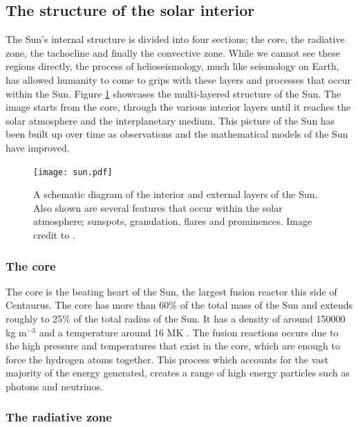 \subsection{The structure of the solar interior}

    The Sun's internal structure is divided into four sections; the core, the radiative zone, the tachocline and finally the convective zone.
    While we cannot see these regions directly, the process of helioseismology, much like seismology on Earth, has allowed humanity to come to grips with these layers and processes that occur within the Sun.
    Figure \ref{fig:Sun} showcases the multi-layered structure of the Sun.
    The image starts from the core, through the various interior layers until it reaches the solar atmosphere and the interplanetary medium.
    This picture of the Sun has been built up over time as observations and the mathematical models of the Sun have improved. 
    
    \begin{figure}
        \centering
        \texttt{[image: sun.pdf]}
        \caption{
                A schematic diagram of the interior and external layers of the Sun.
                Also shown are several features that occur within the solar atmosphere; sunspots, granulation, flares and prominences.
                Image credit to \cite{sun_image}.
               }
        \label{fig:Sun}
    \end{figure}

\subsubsection{The core}

    The core is the beating heart of the Sun, the largest fusion reactor this side of Centaurus.
    The core has more than 60\% of the total mass of the Sun and extends roughly to 25\% of the total radius of the Sun.
    It has a density of around 150000 kg m$^{-3}$ and a temperature around 16 MK \citep{0004-637X-699-2-1403}.
    The fusion reactions occurs due to the high pressure and temperatures that exist in the core, which are enough to force the hydrogen atoms together. 
    This process which accounts for the vast majority of the energy generated, creates a range of high energy particles such as photons and neutrinos.
    
\subsubsection{The radiative zone}

